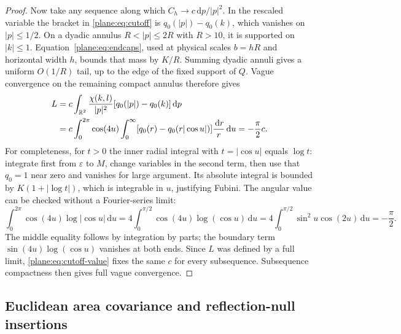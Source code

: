 \documentclass[11pt]{article}
\newcommand{\R}{\mathbb R}
\newcommand{\dd}{\,\mathrm d}
\theoremstyle{definition}
\theoremstyle{remark}
\numberwithin{equation}{section}
\begin{document}
\begin{proof}
Now take any sequence along which $C_h\to c\dd p/|p|^2$.
In the rescaled variable the bracket in \eqref{plane:eq:cutoff} is
$q_0(|p|)-q_0(k)$, which vanishes on $|p|\le1/2$.
On a dyadic annulus $R<|p|\le2R$ with $R>10$, it is supported on
$|k|\le1$.  Equation~\eqref{plane:eq:endcaps}, used at physical
scales $b=hR$ and horizontal width $h$, bounds that mass by $K/R$.
Summing dyadic annuli gives a uniform $O(1/R)$ tail, up to the edge
of the fixed support of $Q$.  Vague convergence on the remaining
compact annulus therefore gives
\begin{align}
 L&=c\int_{\R^2}\frac{\chi(k,l)}{|p|^2}
              [q_0(|p|)-q_0(k)]\dd p \notag\\
  &=c\int_0^{2\pi}\cos(4u)
       \int_0^\infty[q_0(r)-q_0(r|\cos u|)]\frac{\dd r}{r}\dd u
    =-\frac\pi2c.                       \label{plane:eq:cutoff-value}
\end{align}
For completeness, for $t>0$ the inner radial integral with $t=|\cos u|$
equals $\log t$: integrate first from $\varepsilon$ to $M$, change
variables in the second term, then use that $q_0=1$ near zero and
vanishes for large argument.  Its absolute integral is bounded by
$K(1+|\log t|)$, which is integrable in $u$, justifying Fubini.
The angular value can be checked without a Fourier-series limit:
\[
 \int_0^{2\pi}\cos(4u)\log|\cos u|\dd u
 =4\int_0^{\pi/2}\cos(4u)\log(\cos u)\dd u
 =4\int_0^{\pi/2}\sin^2u\cos(2u)\dd u
 =-\frac\pi2.
\]
The middle equality follows by integration by parts; the boundary
term $\sin(4u)\log(\cos u)$ vanishes at both ends.
Since $L$ was defined by a full limit, \eqref{plane:eq:cutoff-value}
fixes the same $c$ for every subsequence.  Subsequence compactness
then gives full vague convergence.
\end{proof}

\subsection{Euclidean area covariance and reflection-null insertions}
\end{document}
